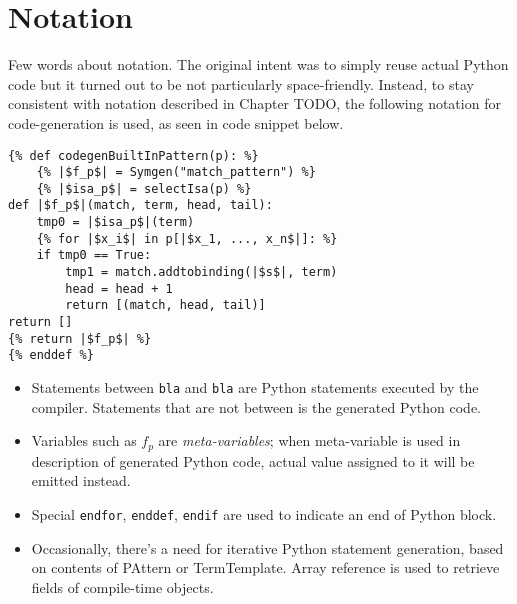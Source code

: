 \section{Notation}

Few words about notation. The original intent was to simply reuse actual Python code but it turned out to be not particularly space-friendly. Instead, to stay consistent with notation described in Chapter TODO, the following notation for code-generation is used, as seen in code snippet below.


\begin{verbatim}
{% def codegenBuiltInPattern(p): %}
	{% |$f_p$| = Symgen("match_pattern") %}
	{% |$isa_p$| = selectIsa(p) %}
def |$f_p$|(match, term, head, tail):
	tmp0 = |$isa_p$|(term)
	{% for |$x_i$| in p[|$x_1, ..., x_n$|]: %}
	if tmp0 == True:
		tmp1 = match.addtobinding(|$s$|, term) 
		head = head + 1
		return [(match, head, tail)]
return []
{% return |$f_p$| %}
{% enddef %}
\end{verbatim} 

\begin{itemize}
\item Statements between \texttt{bla} and \texttt{bla} are Python statements executed by the compiler. Statements that are not between is the generated Python code.
\item Variables such as $f_p$ are \textit{meta-variables}; when meta-variable is used in description of generated Python code, actual value assigned to it will be emitted instead. 
\item Special \texttt{endfor}, \texttt{enddef}, \texttt{endif} are used to indicate an end of Python block.
\item Occasionally, there's a need for iterative Python statement generation, based on contents of PAttern or TermTemplate. Array reference is used to retrieve fields of compile-time objects.
\end{itemize}
